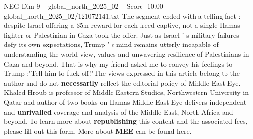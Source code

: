 \begin{textsample}{NEG Dim 9 – global\_north\_2025\_02 – Score -10.00 – global\_north\_2025\_02/121072141.txt}
The segment ended with a telling fact : despite Israel offering a \$5m reward for each freed captive, not a single Hamas fighter or Palestinian in Gaza took the offer.
Just as Israel ' s military failures defy its own expectations, Trump ' s mind remains utterly incapable of understanding the world view, values and unwavering resilience of Palestinians in Gaza and beyond.
That is why my friend asked me to convey his feelings to Trump :"Tell him to fuck off!"The views expressed in this article belong to the author and do not \textbf{necessarily} reflect the editorial policy of Middle East Eye.
Khaled Hroub is professor of Middle Eastern Studies, Northwestern University in Qatar and author of two books on Hamas Middle East Eye delivers independent and \textbf{unrivalled} coverage and analysis of the Middle East, North Africa and beyond.
To learn more about \textbf{republishing} this content and the associated fees, please fill out this form.
More about \textbf{MEE} can be found here.

\end{textsample}
